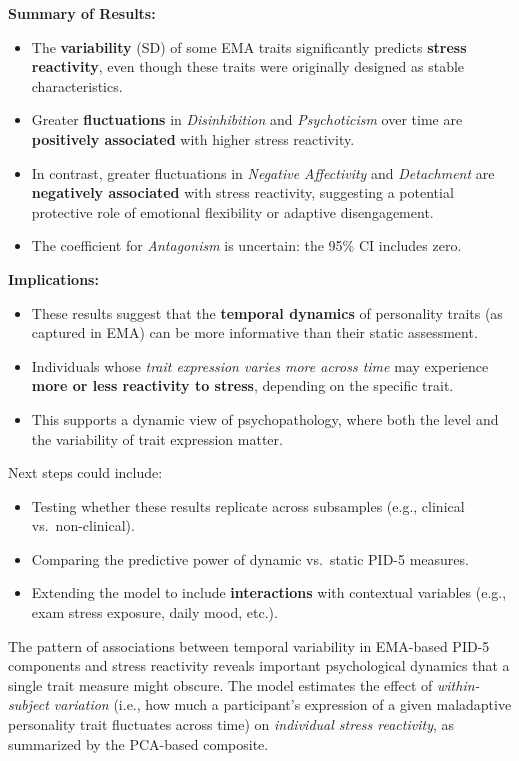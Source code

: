 \documentclass[
  11pt,
  a4paper,
  onecolumn]{article}
\providecommand{\tightlist}{%
  \setlength{\itemsep}{0pt}\setlength{\parskip}{0pt}}
\begin{document}
\textbf{Summary of Results:}

\begin{itemize}
\tightlist
\item
  The \textbf{variability} (SD) of some EMA traits significantly
  predicts \textbf{stress reactivity}, even though these traits were
  originally designed as stable characteristics.
\item
  Greater \textbf{fluctuations} in \emph{Disinhibition} and
  \emph{Psychoticism} over time are \textbf{positively associated} with
  higher stress reactivity.
\item
  In contrast, greater fluctuations in \emph{Negative Affectivity} and
  \emph{Detachment} are \textbf{negatively associated} with stress
  reactivity, suggesting a potential protective role of emotional
  flexibility or adaptive disengagement.
\item
  The coefficient for \emph{Antagonism} is uncertain: the 95\% CI
  includes zero.
\end{itemize}

\textbf{Implications:}

\begin{itemize}
\tightlist
\item
  These results suggest that the \textbf{temporal dynamics} of
  personality traits (as captured in EMA) can be more informative than
  their static assessment.
\item
  Individuals whose \emph{trait expression varies more across time} may
  experience \textbf{more or less reactivity to stress}, depending on
  the specific trait.
\item
  This supports a dynamic view of psychopathology, where both the level
  and the variability of trait expression matter.
\end{itemize}

Next steps could include:

\begin{itemize}
\tightlist
\item
  Testing whether these results replicate across subsamples (e.g.,
  clinical vs.~non-clinical).
\item
  Comparing the predictive power of dynamic vs.~static PID-5 measures.
\item
  Extending the model to include \textbf{interactions} with contextual
  variables (e.g., exam stress exposure, daily mood, etc.).
\end{itemize}

The pattern of associations between temporal variability in EMA-based
PID-5 components and stress reactivity reveals important psychological
dynamics that a single trait measure might obscure. The model estimates
the effect of \emph{within-subject variation} (i.e., how much a
participant's expression of a given maladaptive personality trait
fluctuates across time) on \emph{individual stress reactivity}, as
summarized by the PCA-based composite.
\end{document}
